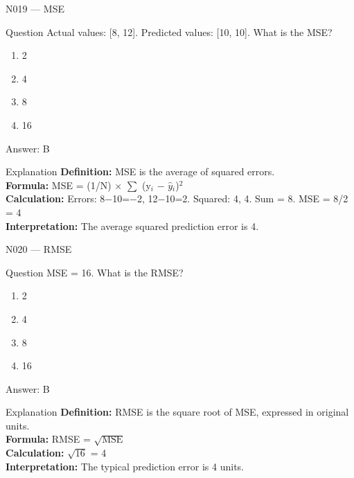 \documentclass[aspectratio=169,8pt]{beamer}
\begin{document}
	\begin{frame}{N019 --- MSE}
		\begin{block}{Question}
			Actual values: [8, 12]. Predicted values: [10, 10]. What is the MSE?
			\begin{enumerate}
				\item 2
				\item 4
				\item 8
				\item 16
			\end{enumerate}
		\end{block}
		\begin{exampleblock}{Answer: B}\end{exampleblock}
		\begin{block}{Explanation}
			\textbf{Definition:} MSE is the average of squared errors.\\
			\textbf{Formula:} MSE = (1/N) $\times$ $\sum$ (y$_{i}$ $-$ $\hat{y}$$_{i}$)$^{2}$\\
			\textbf{Calculation:} Errors: 8$-$10=$-$2, 12$-$10=2. Squared: 4, 4. Sum = 8. MSE = 8/2 = 4\\
			\textbf{Interpretation:} The average squared prediction error is 4.
		\end{block}
	\end{frame}
	
	\begin{frame}{N020 --- RMSE}
		\begin{block}{Question}
			MSE = 16. What is the RMSE?
			\begin{enumerate}
				\item 2
				\item 4
				\item 8
				\item 16
			\end{enumerate}
		\end{block}
		\begin{exampleblock}{Answer: B}\end{exampleblock}
		\begin{block}{Explanation}
			\textbf{Definition:} RMSE is the square root of MSE, expressed in original units.\\
			\textbf{Formula:} RMSE = $\sqrt{\text{MSE}}$\\
			\textbf{Calculation:} $\sqrt{16}$ = 4\\
			\textbf{Interpretation:} The typical prediction error is 4 units.
		\end{block}
	\end{frame}
	
\end{document}

